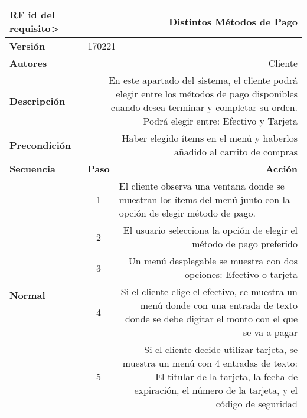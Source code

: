 \documentclass[conference]{IEEEtran}
\begin{document}
\begin{table}[H]
  \centering
   \begin{adjustbox}{width=0.47\textwidth}
    \begin{tabular}{|p{11.215em}|r|r|}
    \toprule
    \textbf{RF id del requisito>} & \multicolumn{2}{p{37.355em}|}{\textbf{Distintos Métodos de Pago}} \\
    \midrule
    \textbf{Versión} & \multicolumn{2}{l|}{170221} \\
    \midrule
    \textbf{Autores} & \multicolumn{2}{p{37.355em}|}{Cliente} \\
    \midrule
    \textbf{Descripción} & \multicolumn{2}{p{37.355em}|}{En este apartado del sistema, el cliente podrá elegir entre los métodos de pago disponibles cuando desea terminar y completar su orden. Podrá elegir entre: Efectivo y Tarjeta} \\
    \midrule
    \textbf{Precondición} & \multicolumn{2}{p{37.355em}|}{Haber elegido ítems en el menú y haberlos añadido al carrito de compras} \\
    \midrule
    \textbf{Secuencia} & \multicolumn{1}{p{5.355em}|}{\textbf{Paso}} & \multicolumn{1}{p{32em}|}{\textbf{Acción}} \\
    \midrule
    \multirow{8}[14]{*}{\textbf{Normal}} & \multicolumn{1}{c|}{\multirow{2}[2]{*}{1}} & \multicolumn{1}{l|}{\multirow{2}[2]{*}{El cliente observa una ventana donde se muestran los ítems del menú junto con la opción de elegir método de pago.}} \\
    \multicolumn{1}{|c|}{} &       &  \\
\cmidrule{2-3}    \multicolumn{1}{|c|}{} & \multicolumn{1}{c|}{2} & \multicolumn{1}{p{32em}|}{El usuario selecciona la opción de elegir el método de pago preferido} \\
\cmidrule{2-3}    \multicolumn{1}{|c|}{} & \multicolumn{1}{c|}{3} & \multicolumn{1}{p{32em}|}{Un menú desplegable se muestra con dos opciones: Efectivo o tarjeta} \\
\cmidrule{2-3}    \multicolumn{1}{|c|}{} & \multicolumn{1}{c|}{4} & \multicolumn{1}{p{32em}|}{Si el cliente elige el efectivo, se muestra un menú donde con una entrada de texto donde se debe digitar el monto con el que se va a pagar} \\
\cmidrule{2-3}    \multicolumn{1}{|c|}{} & \multicolumn{1}{c|}{5} & \multicolumn{1}{p{32em}|}{Si el cliente decide utilizar tarjeta, se muestra un menú con 4 entradas de texto: El titular de la tarjeta, la fecha de expiración, el número de la tarjeta, y el código de seguridad} \\

\end{tabular}
\end{adjustbox}
\end{table}
\end{document}
